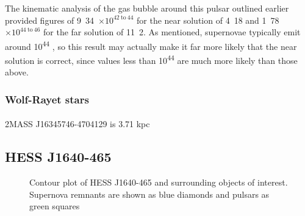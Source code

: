 \documentclass[a4paper, titlepage, oneside]{article}
\newcommand{\e}[1]{\ensuremath{\times 10^{#1}}}
\newcommand{\parsec}{\mathrm{pc}}
\begin{document}
\begin{multicols}{2}
The kinematic analysis of the gas bubble around this pulsar outlined earlier provided figures of \unit{9.34\e{42 \mathrm{~to~} 44}}{\joule} for the near solution of \unit{4.18}{\kilo\parsec} and \unit{1.78\e{44 \mathrm{~to~} 46}}{\joule} for the far solution of \unit{11.2}{\kilo\parsec}. As mentioned, supernovae typically emit around \unit{10^{44}}{\joule} \parencite{Khokhlov:1993}, so this result may actually make it far more likely that the near solution is correct, since values less than \unit{10^{44}} are much more likely than those above.

\subsubsection{Wolf-Rayet stars}
\paragraph{}
2MASS J16345746-4704129 is 3.71 kpc

\subsection{HESS J1640-465}

\begin{figure}[H]
  \centering
  \caption{Contour plot of HESS J1640-465 and surrounding objects of interest. Supernova remnants are shown as blue diamonds and pulsars as green squares}
  \label{fig:hess40}
\end{figure}


\end{multicols}
\end{document}
